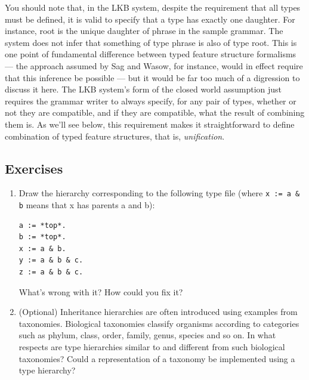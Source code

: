 \documentclass[12pt]{report}
\newcommand{\newterm}[1]{{\it #1}}
\begin{document}
You should note that, in the LKB system, despite the requirement
that all types must be defined, it is valid to specify that
a type has exactly one daughter.  For instance, {\type root}
is the unique daughter of {\type phrase} in the
sample grammar.  The system does not infer that something of type
{\type phrase} is also of type {\type root}.  This is one point of
fundamental difference between typed feature structure formalisms
--- the approach assumed by Sag and Wasow, for instance, would
in effect require that this inference be possible ---
but it would be far too much of a digression to discuss it 
here.
The LKB system's form of the closed world assumption
just requires the grammar writer to always specify, 
for any pair of types, whether or
not they are compatible, and if they are compatible, what the result
of combining them is.  As we'll see below,
this requirement makes it straightforward to define combination of
typed feature structures, that is, \newterm{unification}.  

\subsection{Exercises}
\begin{enumerate}
\item Draw the hierarchy corresponding to 
the following type file (where
\verb+x := a & b+ means
that {\type x} has parents {\type a} and {\type b}):
\begin{verbatim}
a := *top*.
b := *top*.
x := a & b.
y := a & b & c.
z := a & b & c.
\end{verbatim}
What's wrong with it?  How could you fix it?
\item (Optional) Inheritance hierarchies are often introduced
using examples from taxonomies.
Biological taxonomies classify organisms
according to categories such as phylum, class, order, family, genus, species and
so on.  In what respects are type hierarchies similar to and different
from such
biological taxonomies?  Could a representation of a taxonomy
be implemented using a type hierarchy?
\end{enumerate}
\end{document}
